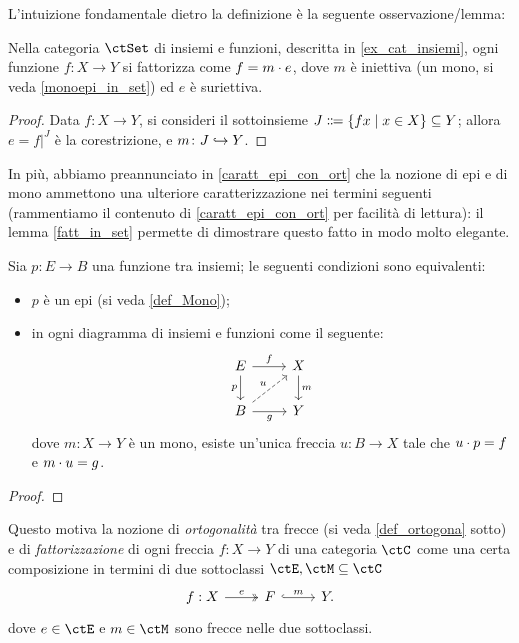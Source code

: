 \medskip
L'intuizione fondamentale dietro la definizione è la seguente osservazione/lemma:
\begin{lemma}\label{fatt_in_set}
 Nella categoria \(\ctSet\) di insiemi e funzioni, descritta in \ref{ex_cat_insiemi}, ogni funzione \(f \colon X \to Y\) si fattorizza come \(f = m \cdot e\), dove \(m\) è iniettiva (un mono, si veda \ref{monoepi_in_set}) ed \(e\) è suriettiva.%
\end{lemma}
\begin{proof}
 Data \(f \colon X \to Y\), si consideri il sottoinsieme \(J\defeq\{fx\mid x\in X\}\subseteq Y\); allora \(e=f|^J\) è la corestrizione, e \(m \colon J\hookrightarrow Y\).
\end{proof}
In più, abbiamo preannunciato in \ref{caratt_epi_con_ort} che la nozione di epi e di mono ammettono una ulteriore caratterizzazione nei termini seguenti (rammentiamo il contenuto di \ref{caratt_epi_con_ort} per facilità di lettura): il lemma \ref{fatt_in_set} permette di dimostrare questo fatto in modo molto elegante.
\begin{proposition*}
 Sia \(p \colon E \to B\) una funzione tra insiemi; le seguenti condizioni sono equivalenti:
 \begin{itemize}
  \item \(p\) è un epi (si veda \ref{def_Mono});
  \item in ogni diagramma di insiemi e funzioni come il seguente:
        \[\begin{tikzcd}
          E \ar[r, "f"]\ar[d, "p"']& X \ar[d, "m"]\\
          B \ar[r, "g"'] \ar[ur, dashed, "u"]& Y
         \end{tikzcd}\]
        dove \(m \colon X\to Y\) è un mono, esiste un'unica freccia \(u \colon B\to X\) tale che \(u\cdot p = f\) e \(m\cdot u = g\).
 \end{itemize}
\end{proposition*}
\begin{proof}
\end{proof}
Questo motiva la nozione di \emph{ortogonalità} tra frecce (si veda \ref{def_ortogona} sotto) e di \emph{fattorizzazione} di ogni freccia \(f \colon X\to Y\) di una categoria \(\ctC\) come una certa composizione in termini di due sottoclassi \(\ctE,\ctM\subseteq\ctC\)
\[
 \begin{tikzcd}
  f : X \ar[r, "e", two heads]& F \ar[r, "m", hook] & Y.
 \end{tikzcd}
\]
dove \(e\in\ctE\) e \(m\in\ctM\) sono frecce nelle due sottoclassi.

